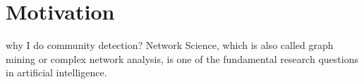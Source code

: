 \section{Motivation}
why I do community detection?
Network Science, which is also called graph mining or complex network analysis, is one of the fundamental research questions in artificial intelligence. 
